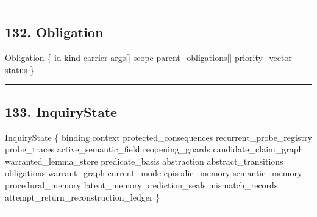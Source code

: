\documentclass[
]{article}
\newenvironment{Shaded}{}{}
\newcommand{\NormalTok}[1]{#1}
\begin{document}
\begin{center}\rule{0.5\linewidth}{0.5pt}\end{center}

\subsection{132. Obligation}\label{obligation}

\begin{Shaded}
\begin{Highlighting}[]
\NormalTok{Obligation \{}
\NormalTok{    id}
\NormalTok{    kind}
\NormalTok{    carrier}
\NormalTok{    args[]}
\NormalTok{    scope}
\NormalTok{    parent\_obligations[]}
\NormalTok{    priority\_vector}
\NormalTok{    status}
\NormalTok{\}}
\end{Highlighting}
\end{Shaded}

\begin{center}\rule{0.5\linewidth}{0.5pt}\end{center}

\subsection{133. InquiryState}\label{inquirystate}

\begin{Shaded}
\begin{Highlighting}[]
\NormalTok{InquiryState \{}
\NormalTok{    binding}
\NormalTok{    context}
\NormalTok{    protected\_consequences}
\NormalTok{    recurrent\_probe\_registry}
\NormalTok{    probe\_traces}
\NormalTok{    active\_semantic\_field}
\NormalTok{    reopening\_guards}
\NormalTok{    candidate\_claim\_graph}
\NormalTok{    warranted\_lemma\_store}
\NormalTok{    predicate\_basis}
\NormalTok{    abstraction}
\NormalTok{    abstract\_transitions}
\NormalTok{    obligations}
\NormalTok{    warrant\_graph}
\NormalTok{    current\_mode}
\NormalTok{    episodic\_memory}
\NormalTok{    semantic\_memory}
\NormalTok{    procedural\_memory}
\NormalTok{    latent\_memory}
\NormalTok{    prediction\_seals}
\NormalTok{    mismatch\_records}
\NormalTok{    attempt\_return\_reconstruction\_ledger}
\NormalTok{\}}
\end{Highlighting}
\end{Shaded}

\begin{center}\rule{0.5\linewidth}{0.5pt}\end{center}
\end{document}
